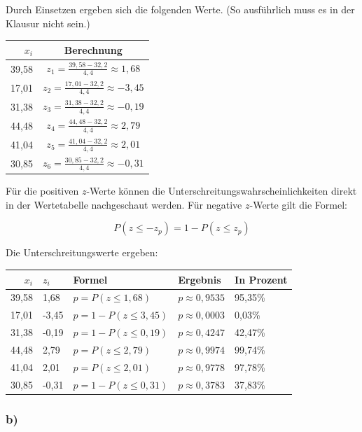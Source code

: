 \documentclass[
  11pt,
  ngerman,
  a4paper,
]{report}
\begin{document}
Durch Einsetzen ergeben sich die folgenden Werte. (So ausführlich muss es in der Klausur nicht sein.)

\begin{table}[H]
\centering
\begin{tabular}{rc}
\toprule
$x_i$ & Berechnung\\
\midrule
39,58 & $z_{1}=\frac{39{,}58-32{,}2}{4{,}4}\approx1{,}68$\\
17,01 & $z_{2}=\frac{17{,}01-32{,}2}{4{,}4}\approx-3{,}45$\\
31,38 & $z_{3}=\frac{31{,}38-32{,}2}{4{,}4}\approx-0{,}19$\\
44,48 & $z_{4}=\frac{44{,}48-32{,}2}{4{,}4}\approx2{,}79$\\
41,04 & $z_{5}=\frac{41{,}04-32{,}2}{4{,}4}\approx2{,}01$\\
30,85 & $z_{6}=\frac{30{,}85-32{,}2}{4{,}4}\approx-0{,}31$\\
\bottomrule
\end{tabular}
\end{table}

Für die positiven \(z\)-Werte können die Unterschreitungs­wahrscheinlichkeiten direkt in der Wertetabelle nachgeschaut werden. Für negative \(z\)-Werte gilt die Formel:

\[ P(z\leq -z_p) = 1-P(z \leq z_p) \]

Die Unterschreitungswerte ergeben:

\begin{table}[H]
\centering
\begin{tabular}{rllll}
\toprule
$x_i$ & $z_i$ & Formel & Ergebnis & In Prozent\\
\midrule
39,58 & 1,68 & $p=P(z \leq 1{,}68)$ & $p \approx 0{,}9535$ & 95,35\%\\
17,01 & -3,45 & $p=1-P(z \leq 3{,}45)$ & $p \approx 0{,}0003$ & 0,03\%\\
31,38 & -0,19 & $p=1-P(z \leq 0{,}19)$ & $p \approx 0{,}4247$ & 42,47\%\\
44,48 & 2,79 & $p=P(z \leq 2{,}79)$ & $p \approx 0{,}9974$ & 99,74\%\\
41,04 & 2,01 & $p=P(z \leq 2{,}01)$ & $p \approx 0{,}9778$ & 97,78\%\\
30,85 & -0,31 & $p=1-P(z \leq 0{,}31)$ & $p \approx 0{,}3783$ & 37,83\%\\
\bottomrule
\end{tabular}
\end{table}

\hypertarget{b-9}{%
\subsubsection{b)}\label{b-9}}
\end{document}
